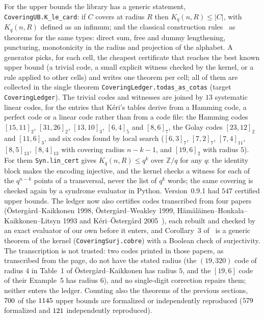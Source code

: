 \documentclass[11pt]{amsart}
\theoremstyle{definition}
\theoremstyle{remark}
\begin{document}
For the upper bounds the library has a generic statement, \texttt{CoveringUB.\allowbreak K\_\allowbreak le\_\allowbreak card}: if $C$ covers at radius $R$ then $K_q(n,R)\le|C|$, with $K_q(n,R)$ defined as an infimum; and the classical construction rules~\cite[Ch.~3]{cohen1997} as theorems for the same types: direct sum, free and dummy lengthening, puncturing, monotonicity in the radius and projection of the alphabet.
A generator picks, for each cell, the cheapest certificate that reaches the best known upper bound (a trivial code, a small explicit witness checked by the kernel, or a rule applied to other cells) and writes one theorem per cell; all of them are collected in the single theorem \texttt{CoveringLedger.\allowbreak todas\_\allowbreak as\_\allowbreak cotas} (target \texttt{CoveringLedger}).
The trivial codes and witnesses are joined by $13$ systematic linear codes, for the entries that Kéri's tables derive from a Hamming code, a perfect code or a linear code rather than from a code file: the Hamming codes $[15,11]_2$, $[31,26]_2$, $[13,10]_3$, $[6,4]_5$ and $[8,6]_7$, the Golay codes $[23,12]_2$ and $[11,6]_3$, and six codes found by local search ($[6,3]_7$, $[7,2]_7$, $[7,4]_{11}$, $[8,5]_{13}$, $[8,4]_{13}$ with covering radius $n-k-1$, and $[19,6]_2$ with radius $5$).
For them \texttt{Syn.\allowbreak lin\_\allowbreak cert} gives $K_q(n,R)\le q^k$ over $\mathbb{Z}/q$ for any $q$: the identity block makes the encoding injective, and the kernel checks a witness for each of the $q^{n-k}$ points of a transversal, never the list of $q^k$ words; the same covering is checked again by a syndrome evaluator in Python.
Version~0.9.1 had $547$ certified upper bounds. The ledger now also certifies codes transcribed from four papers (Östergård--Kaikkonen 1998, Östergård--Weakley 1999, Hämäläinen--Honkala--Kaikkonen--Litsyn 1993 and Kéri--Östergård 2005~\cite{ko2005}), each rebuilt and checked by an exact evaluator of our own before it enters, and Corollary~3 of~\cite{ko2005} is a generic theorem of the kernel (\texttt{CoveringSurj.\allowbreak cobre}) with a Boolean check of surjectivity.
The transcription is not trusted: two codes printed in those papers, as transcribed from the page, do not have the stated radius (the $(19,320)$ code of radius $4$ in Table~1 of Östergård--Kaikkonen has radius $5$, and the $[19,6]$ code of their Example~5 has radius $6$), and no single-digit correction repairs them; neither enters the ledger.
Counting also the theorems of the previous sections, $700$ of the $1145$ upper bounds are formalized or independently reproduced ($579$ formalized and $121$ independently reproduced).
\end{document}
